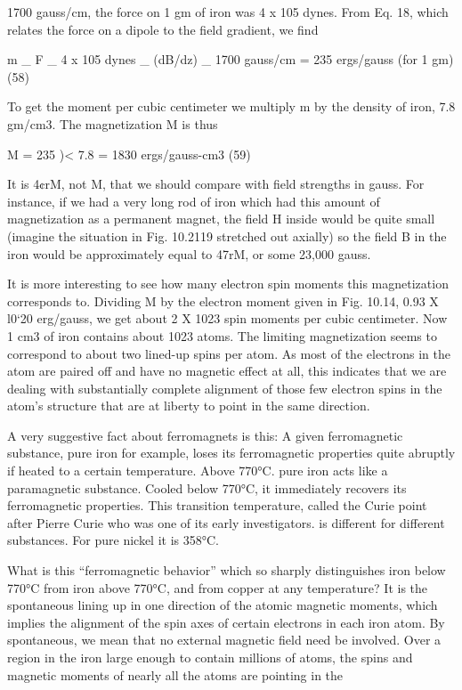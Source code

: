 {{{%
1700 gauss/cm, the force on 1 gm of iron was 4 x 105 dynes. From
Eq. 18, which relates the force on a dipole to the field gradient, we find

m _ F _ 4 x 105 dynes
_ (dB/dz) _ 1700 gauss/cm
= 235 ergs/gauss (for 1 gm) (58)

To get the moment per cubic centimeter we multiply m by the
density of iron, 7.8 gm/cm3. The magnetization M is thus

M = 235 )< 7.8 = 1830 ergs/gauss-cm3 (59)

It is 4¢rM, not M, that we should compare with field strengths in gauss.
For instance, if we had a very long rod of iron which had this amount
of magnetization as a permanent magnet, the field H inside would
be quite small (imagine the situation in Fig. 10.2119 stretched out
axially) so the field B in the iron would be approximately equal to
47rM, or some 23,000 gauss.

It is more interesting to see how many electron spin moments this
magnetization corresponds to. Dividing M by the electron moment
given in Fig. 10.14, 0.93 X l0‘20 erg/gauss, we get about 2 X 1023
spin moments per cubic centimeter. Now 1 cm3 of iron contains
about 1023 atoms. The limiting magnetization seems to correspond
to about two lined-up spins per atom. As most of the electrons in
the atom are paired off and have no magnetic effect at all, this indicates
that we are dealing with substantially complete alignment
of those few electron spins in the atom's structure that are at liberty
to point in the same direction.

A very suggestive fact about ferromagnets is this: A given ferromagnetic
substance, pure iron for example, loses its ferromagnetic
properties quite abruptly if heated to a certain temperature. Above
770°C. pure iron acts like a paramagnetic substance. Cooled below
770°C, it immediately recovers its ferromagnetic properties. This
transition temperature, called the Curie point after Pierre Curie who
was one of its early investigators. is different for different substances.
For pure nickel it is 358°C.

What is this ``ferromagnetic behavior'' which so sharply distinguishes
iron below 770°C from iron above 770°C, and from copper
at any temperature? It is the spontaneous lining up in one direction
of the atomic magnetic moments, which implies the alignment of
the spin axes of certain electrons in each iron atom. By spontaneous,
we mean that no external magnetic field need be involved. Over a
region in the iron large enough to contain millions of atoms, the spins
and magnetic moments of nearly all the atoms are pointing in the

}}}

